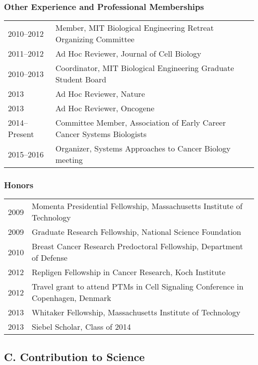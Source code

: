 \documentclass[12pt]{article}
\begin{document}
\subsubsection{Other Experience and Professional Memberships}

\begin{tabular}{p{1.1in}p{6.1in}}
2010--2012 & Member, MIT Biological Engineering Retreat Organizing Committee\\
2011--2012 & Ad Hoc Reviewer, Journal of Cell Biology\\
2010--2013 & Coordinator, MIT Biological Engineering Graduate Student Board\\
2013 & Ad Hoc Reviewer, Nature\\
2013 & Ad Hoc Reviewer, Oncogene\\
2014--Present & Committee Member, Association of Early Career Cancer Systems Biologists\\
2015--2016 & Organizer, Systems Approaches to Cancer Biology meeting\\
\end{tabular}


\subsubsection{Honors}

\begin{tabular}{p{1.1in}p{6.1in}}
 2009 & Momenta Presidential Fellowship, Massachusetts Institute of Technology\\
 2009 & Graduate Research Fellowship, National Science Foundation\\
 2010 & Breast Cancer Research Predoctoral Fellowship, Department of Defense\\
 2012 & Repligen Fellowship in Cancer Research, Koch Institute\\
 2012 & Travel grant to attend PTMs in Cell Signaling Conference in Copenhagen, Denmark\\
 2013 & Whitaker Fellowship, Massachusetts Institute of Technology\\
 2013 & Siebel Scholar, Class of 2014\\	
\end{tabular}





\subsection{C. Contribution to Science}
\end{document}
